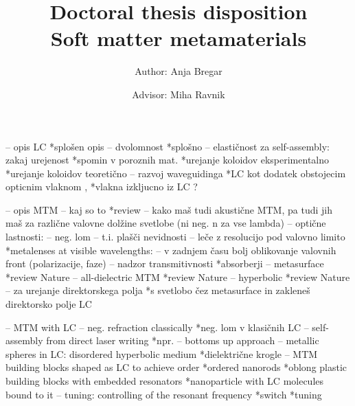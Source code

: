 \documentclass[a4paper,10pt]{article}
\title{\Large{Doctoral thesis disposition} \\ \LARGE{Soft matter metamaterials}}
\author{Author: Anja Bregar \and Advisor: Miha Ravnik}
\begin{document}
\maketitle

% 
% 
% 
%
-- opis LC *splošen opis \cite{degennes}
  -- dvolomnost *splošno \cite{hecht-optics}
  -- elastičnost za self-assembly: zakaj urejenost *spomin v poroznih mat. \cite{tanaka-lc-memory-porous} 
                                                   *urejanje koloidov eksperimentalno \cite{musevic-2013-assembly,smalyukh-2009-assembly} 
                                                   *urejanje koloidov teoretično \cite{zumer-2012-colloidal-assembly}
  -- razvoj waveguidinga *LC kot dodatek obstojecim opticnim vlaknom \cite{kitzerow-2014-lc-fibre,zografopoulos-2012-lc-fibre}, 
                         *vlakna izkljucno iz LC \cite{cancula-2016-waveguiding}? 

-- opis MTM
  -- kaj so to *review \cite{wegener-2011-nature-review}
  -- kako maš tudi akustične MTM, pa tudi jih maš za različne valovne dolžine svetlobe (ni neg. n za vse lambda)
  -- optične lastnosti: 
    -- neg. lom \cite{schultz-2000-first-mtm,zhang-2008-fishnet}
    -- t.i. plašči nevidnosti \cite{zhang-2015-skin-cloak}
    -- leče z resolucijo pod valovno limito *metalenses at visible wavelengths: \cite{capasso-2016-metalens}
    -- v zadnjem času bolj oblikovanje valovnih front (polarizacije, faze) \cite{capasso-2014-flat-optics-metasurface}
    -- nadzor transmitivnosti *absorberji \cite{padilla-2012-mtm-absorbers}
    -- metasurface *review Nature \cite{meinzer-2014-metasurface}
    -- all-dielectric MTM *review Nature \cite{jacob-2016-all-dielectric}
    -- hyperbolic *review Nature \cite{kivshar-2013-hyperbolic}
    -- za urejanje direktorskega polja *s svetlobo čez metasurface in zakleneš direktorsko polje LC \cite{ozaki-2016-patterned-lc}

-- MTM with LC
  -- neg. refraction classically *neg. lom v klasičnih LC \cite{lavrentovich-2006-lc-neg,assanto-2007-nematicons-lc-neg}
  -- self-assembly from direct laser writing *npr. \cite{tartan-2017-dlw} -- bottoms up approach
  -- metallic spheres in LC: disordered hyperbolic medium *dielektrične krogle \cite{xuan-2013-nanoparticle-lc,khoo-2014-nanoparticle-lc}
  -- MTM building blocks shaped as LC to achieve order *ordered nanorods \cite{lavrentovich-2008-gold-nanorods,smalyukh-2010-self-alignment,lavrentovich-2009-nanorods} 
                                                       *oblong plastic building blocks with embedded resonators \cite{shadrivov-2016-meta-liquid-crystal}
                                                       *nanoparticle with LC molecules bound to it \cite{goodby-2011-lc-gold-mtm}
  -- tuning: controlling of the resonant frequency *switch \cite{buchnev-2015-lc-mtm-switch}
                                                   *tuning \cite{zhang-2007-lc-mtm-tuning}
\end{document}
